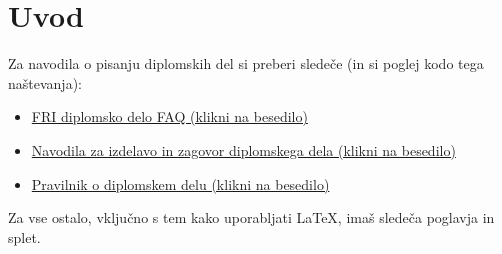 \chapter{Uvod}

Za navodila o pisanju diplomskih del si preberi sledeče (in si poglej kodo tega naštevanja):
\begin{itemize}
    \item \href{https://fri.uni-lj.si/sl/diplomsko-delo}{FRI diplomsko delo FAQ (klikni na besedilo)}
    \item \href{https://www.fri.uni-lj.si/upload/Pravilniki,%20prosnje,%20ceniki%20(NEW)/Pravilniki/slovenska/2019_okt_Navodila_za_diplomsko_d.pdf}{Navodila za izdelavo in zagovor diplomskega dela (klikni na besedilo)}
    \item \href{https://www.fri.uni-lj.si/upload/Pravilniki,%20prosnje,%20ceniki%20(NEW)/Pravilniki/slovenska/Pravilnik_o_diplomskem_delu_prvo.pdf}{Pravilnik o diplomskem delu (klikni na besedilo)}
\end{itemize}

\noindent
Za vse ostalo, vključno s tem kako uporabljati LaTeX, imaš sledeča poglavja in splet.
